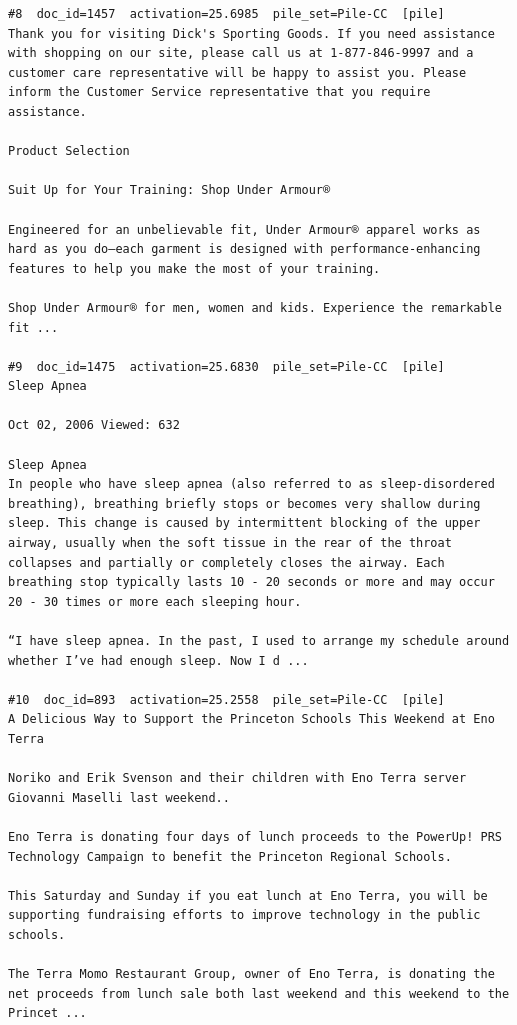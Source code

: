 \begin{verbatim}
#8  doc_id=1457  activation=25.6985  pile_set=Pile-CC  [pile]
Thank you for visiting Dick's Sporting Goods. If you need assistance with shopping on our site, please call us at 1-877-846-9997 and a customer care representative will be happy to assist you. Please inform the Customer Service representative that you require assistance.

Product Selection

Suit Up for Your Training: Shop Under Armour®

Engineered for an unbelievable fit, Under Armour® apparel works as hard as you do—each garment is designed with performance-enhancing features to help you make the most of your training.

Shop Under Armour® for men, women and kids. Experience the remarkable fit ...

#9  doc_id=1475  activation=25.6830  pile_set=Pile-CC  [pile]
Sleep Apnea

Oct 02, 2006 Viewed: 632

Sleep Apnea
In people who have sleep apnea (also referred to as sleep-disordered breathing), breathing briefly stops or becomes very shallow during sleep. This change is caused by intermittent blocking of the upper airway, usually when the soft tissue in the rear of the throat collapses and partially or completely closes the airway. Each breathing stop typically lasts 10 - 20 seconds or more and may occur 20 - 30 times or more each sleeping hour.

“I have sleep apnea. In the past, I used to arrange my schedule around whether I’ve had enough sleep. Now I d ...

#10  doc_id=893  activation=25.2558  pile_set=Pile-CC  [pile]
A Delicious Way to Support the Princeton Schools This Weekend at Eno Terra

Noriko and Erik Svenson and their children with Eno Terra server Giovanni Maselli last weekend..

Eno Terra is donating four days of lunch proceeds to the PowerUp! PRS Technology Campaign to benefit the Princeton Regional Schools.

This Saturday and Sunday if you eat lunch at Eno Terra, you will be supporting fundraising efforts to improve technology in the public schools.

The Terra Momo Restaurant Group, owner of Eno Terra, is donating the net proceeds from lunch sale both last weekend and this weekend to the Princet ...

\end{verbatim}

